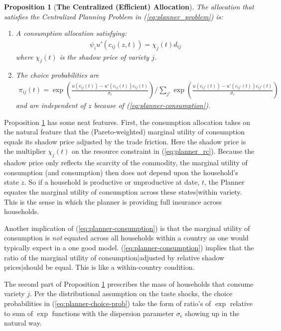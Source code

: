 \documentclass[12pt,pdftex]{article}
\newtheorem{prp}{Proposition}
\begin{document}
\begin{onehalfspacing}
\begin{prp}[\textbf{The Centralized (Efficient) Allocation}]\label{prp:efficient-allocation} The allocation that satisfies the Centralized Planning Problem in (\ref{eq:planner_problem}) is:
\begin{enumerate}
\item A consumption allocation satisfying:
\begin{align}
\psi_{i} u'(c_{ij}(z,t) ) = \chi_{j}(t) d_{ij}
\label{eq:planner-consumption}
\end{align}
where $\chi_{j}(t)$ is the shadow price of variety $j$.
\item The choice probabilities are
\begin{align}
\pi_{ij}(t) =\exp \left( \frac{u(c_{ij}(t)) - u'(c_{ij}(t))c_{ij}(t)}{\sigma_{\epsilon}}\right) \bigg / \sum_{j'}\exp \left( \frac{u(c_{ij'}(t)) - u'(c_{ij'}(t))c_{ij'}(t)}{\sigma_{\epsilon}} \right)
\label{eq:planner-choice-prob}
\end{align}
and are independent of $z$ because of (\ref{eq:planner-consumption}).
\end{enumerate}
\end{prp}
Proposition \ref{prp:efficient-allocation} has some neat features. First, the consumption allocation takes on the natural feature that the (Pareto-weighted) marginal utility of consumption equals its shadow price adjusted by the trade friction. Here the shadow price is the multiplier $\chi_{j}(t)$ on the resource constraint in (\ref{eq:planner_rc}). Because the shadow price only reflects the scarcity of the commodity, the marginal utility of consumption (and consumption) then does not depend upon the household's state $z$. So if a household is productive or unproductive at date, $t$, the Planner equates the marginal utility of consumption across these states|within variety. This is the sense in which the planner is providing full insurance across households.

Another implication of (\ref{eq:planner-consumption}) is that the marginal utility of consumption is \textit{not} equated across all households within a country as one would typically expect in a one good model. (\ref{eq:planner-consumption}) implies that the ratio of the marginal utility of consumption|adjusted by relative shadow prices|should be equal. This is like a within-country \citet{backus1993} condition.

The second part of Proposition \ref{prp:efficient-allocation} prescribes the mass of households that consume variety $j$. Per the distributional assumption on the taste shocks, the choice probabilities in (\ref{eq:planner-choice-prob}) take the form of ratio's of $\exp$ relative to sum of $\exp$ functions with the dispersion parameter $\sigma_{\epsilon}$ showing up in the natural way.


\end{onehalfspacing}
\end{document}

